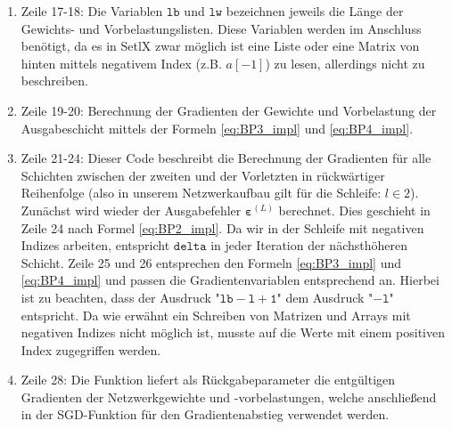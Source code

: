 \begin{enumerate}
\item Zeile 17-18: Die Variablen $\mathtt{lb}$ und $\mathtt{lw}$ bezeichnen jeweils die Länge der Gewichts- und Vorbelastungslisten. Diese Variablen werden im Anschluss benötigt, da es in SetlX zwar möglich ist eine Liste oder eine Matrix von hinten mittels negativem Index (z.B. $a[-1]$) zu lesen, allerdings nicht zu beschreiben.
\item Zeile 19-20: Berechnung der Gradienten der Gewichte und Vorbelastung der Ausgabeschicht mittels der Formeln \eqref{eq:BP3_impl} und \eqref{eq:BP4_impl}.
\item Zeile 21-24: Dieser Code beschreibt die Berechnung der Gradienten für alle Schichten zwischen der zweiten und der Vorletzten in rückwärtiger Reihenfolge (also in unserem Netzwerkaufbau gilt für die Schleife: $l \in {2}$). Zunächst wird wieder der Ausgabefehler $\boldsymbol{\varepsilon}^{(L)}$ berechnet. Dies geschieht in Zeile 24 nach Formel \eqref{eq:BP2_impl}. Da wir in der Schleife mit negativen Indizes arbeiten, entspricht $\mathtt{delta}$ in jeder Iteration der nächsthöheren Schicht. Zeile 25 und 26 entsprechen den Formeln \eqref{eq:BP3_impl} und \eqref{eq:BP4_impl} und passen die Gradientenvariablen entsprechend an. Hierbei ist zu beachten, dass der Ausdruck "$\mathtt{lb-l+1}$" dem Ausdruck "$\mathtt{-l}$" entspricht. Da wie erwähnt ein Schreiben von Matrizen und Arrays mit negativen Indizes nicht möglich ist, musste auf die Werte mit einem positiven Index zugegriffen werden.
\item Zeile 28: Die Funktion liefert als Rückgabeparameter die entgültigen Gradienten der Netzwerkgewichte und -vorbelastungen, welche anschließend in der SGD-Funktion für den Gradientenabstieg verwendet werden.
\end{enumerate}

